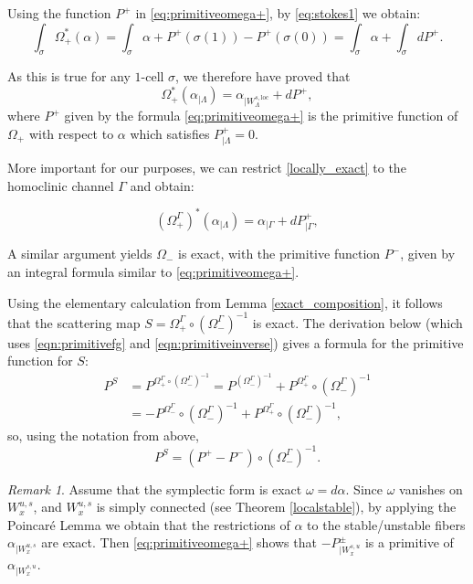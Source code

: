 \documentclass[11pt]{amsart}
\theoremstyle{definition}
\theoremstyle{remark}
\newtheorem{rem}[thm]{Remark}
\numberwithin{equation}{section}
\begin{document}
Using the function $P^+$  in \eqref{eq:primitiveomega+}, by \eqref{eq:stokes1} we obtain:
\[
\int_{\sigma}\Omega_+^*(\alpha)=\int_\sigma \alpha
+P^+(\sigma(1))-P^+(\sigma(0))= \int_\sigma \alpha +\int_{\sigma}dP^+ .\]

As this is true for any $1$-cell $\sigma$, we therefore have proved that
\begin{equation}\label{locally_exact}
\Omega_+^*\left(\alpha_{\mid \Lambda}\right) = \alpha_{\mid W^{s,\textrm{loc}}_ \Lambda} + dP^+ ,
\end{equation}
where  $P^+$ given by the formula  \eqref{eq:primitiveomega+} is the  primitive function of $\Omega_+$
with respect to $\alpha$ which satisfies $P^+_{\mid \Lambda} = 0 $.

\medskip

More important for our purposes,  we can restrict \eqref{locally_exact}
to the homoclinic channel $\Gamma$ and obtain:

\[
\left(\Omega_+^\Gamma\right)^*\left(\alpha _{\mid \Lambda}\right) = \alpha_{\mid \Gamma} + dP^+_{\mid \Gamma} ,
\]

A similar argument yields $\Omega_-$ is exact, with the primitive function $P^-$,
given by an integral formula similar to \eqref{eq:primitiveomega+}.

\medskip

Using the elementary calculation from Lemma \ref{exact_composition}, it follows
that the scattering map $S=\Omega^\Gamma_+\circ (\Omega^\Gamma_-)^{-1}$ is exact.
The derivation below (which uses \eqref{eqn:primitivefg} and \eqref{eqn:primitiveinverse}) gives a formula for the primitive function for $S$:
\begin{equation*}
  \begin{split}
  P^S &=
  P^{
  \Omega_+^\Gamma \circ (\Omega_-^\Gamma)^{-1}}=
P^ {({\Omega_-^\Gamma})^{-1}}+P^{{\Omega_+^\Gamma}}\circ  ({\Omega_-^\Gamma})^{-1} \\
  & = - P^{\Omega_-^\Gamma }\circ  (\Omega_-^\Gamma)^{-1}
+ P^{\Omega_+^\Gamma}\circ ({\Omega_-^\Gamma})^{-1},
\end{split}
    \end{equation*}
so, using the notation from above,
\begin{equation*}\label{eqn:primitive_scattering}
  P^S=(P^+-P^-)\circ(\Omega_-^\Gamma)^{-1}.
\end{equation*}



\begin{rem}
Assume that the symplectic form is exact $\omega=d\alpha$.
Since $\omega$ vanishes on $W^{u,s}_x$, and  $W^{u,s}_x$ is simply connected (see Theorem \ref{localstable}),
by applying the Poincar\'e Lemma we obtain that the restrictions of $\alpha$ to the stable/unstable fibers  $\alpha_{\mid W^{u,s}_x}$ are exact.
Then  \eqref{eq:primitiveomega+} shows that $-P^\pm_{\mid W^{s,u}_x}$ is a primitive of $\alpha_{\mid W^{s,u}_x}$.
\end{rem}
\end{document}
